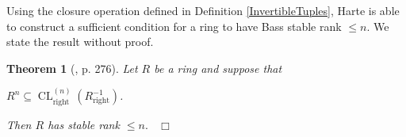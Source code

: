 \documentclass[12pt, oneside]{book}
\newtheorem{theorem}{Theorem}[subsection]
\newcommand{\proof}{{\noindent \it Proof:~}}
\newcommand{\qed}{\hfill ~$\Box$\\}
\def\CL{\operatorname{CL}}
\def\Left{\operatorname{left}}
\def\Right{\operatorname{right}}
\begin{document}
\noindent Using the closure operation defined in Definition \ref{InvertibleTuples}, 
Harte is able to construct a sufficient condition for a ring to have Bass stable rank $\leqslant n$. 
We state the result without proof.
\begin{theorem} [{\cite{CH3}, p. 276}]
\normalfont
Let $R$ be a ring and suppose that
\begin{center}
$R^n \subseteq \CL_{\Right}^{(n)}(R^{-1}_{\Right})$.
\end{center}
Then $R$ has stable rank $\leqslant n.$
\qed
\end{theorem}

\end{document}
